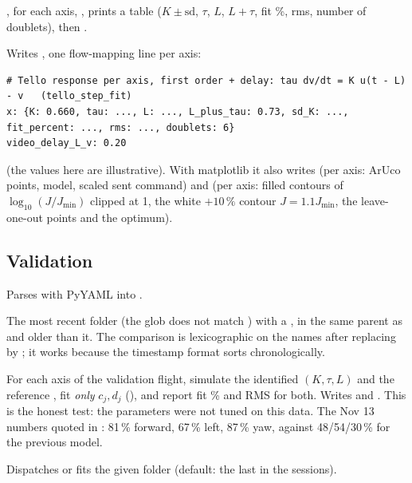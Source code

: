 ,  for each axis, , prints a table
($K \pm \text{sd}$, $\tau$, $L$, $L+\tau$, fit \%, rms, number of doublets), then .

Writes , one flow-mapping line per axis:
\begin{lstlisting}
# Tello response per axis, first order + delay: tau dv/dt = K u(t - L) - v   (tello_step_fit)
x: {K: 0.660, tau: ..., L: ..., L_plus_tau: 0.73, sd_K: ..., fit_percent: ..., rms: ..., doublets: 6}
video_delay_L_v: 0.20
\end{lstlisting}
(the values here are illustrative). With matplotlib it also writes  (per axis: ArUco points,
model, scaled sent command) and  (per axis: filled contours of $\log_{10}(J/J_{\min})$
clipped at 1, the white $+10\,\%$ contour $J = 1.1 J_{\min}$, the leave-one-out points and the optimum).

\subsection{Validation}

Parses  with PyYAML into .

The most recent  folder (the glob  does not match ) with a
, in the same parent as  and older than it. The comparison is lexicographic on the
names after replacing  by ; it works because the timestamp format
 sorts chronologically.

For each axis of the validation flight, simulate the identified $(K, \tau, L)$ and the reference
, fit \emph{only} $c_j, d_j$ (), and report fit \% and RMS for both.
Writes  and . This is the honest test: the parameters were not tuned on
this data. The Nov 13 numbers quoted in : 81\,\% forward, 67\,\% left, 87\,\% yaw, against
48/54/30\,\% for the previous model.

Dispatches  or fits the given folder (default: the last  in the sessions).

